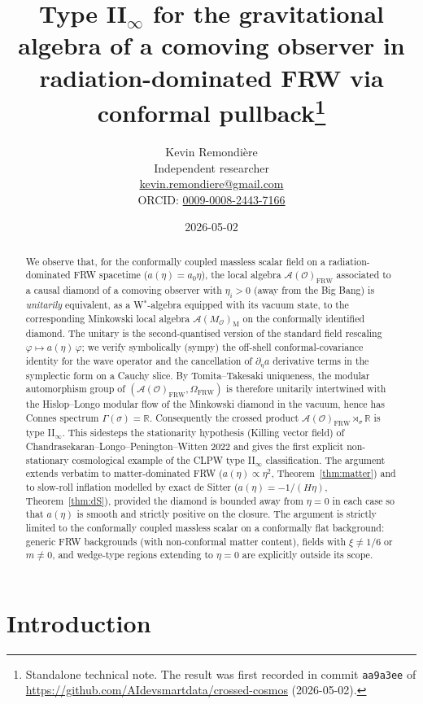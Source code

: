 \documentclass[11pt]{article}
\title{Type II$_\infty$ for the gravitational algebra of a comoving observer in radiation-dominated FRW via conformal pullback\thanks{Standalone technical note. The result was first recorded in commit \texttt{aa9a3ee} of \url{https://github.com/AIdevsmartdata/crossed-cosmos} (2026-05-02).}}
\author{Kevin Remondi\`ere\\
\small Independent researcher\\
\small \href{mailto:kevin.remondiere@gmail.com}{kevin.remondiere@gmail.com}\\
\small ORCID: \href{https://orcid.org/0009-0008-2443-7166}{0009-0008-2443-7166}}
\date{2026-05-02}
\theoremstyle{definition}
\newcommand{\R}{\mathbb{R}}
\renewcommand{\AA}{\mathcal{A}}
\newcommand{\OO}{\mathcal{O}}
\newcommand{\FRW}{\mathrm{FRW}}
\newcommand{\Mink}{\mathrm{M}}
\begin{document}
\maketitle

\begin{abstract}
We observe that, for the conformally coupled massless scalar field on a radiation-dominated FRW spacetime ($a(\eta)=a_0 \eta$), the local algebra $\AA(\OO)_\FRW$ associated to a causal diamond of a comoving observer with $\eta_i>0$ (away from the Big Bang) is \emph{unitarily} equivalent, as a W$^*$-algebra equipped with its vacuum state, to the corresponding Minkowski local algebra $\AA(M_\OO)_\Mink$ on the conformally identified diamond. The unitary is the second-quantised version of the standard field rescaling $\varphi \mapsto a(\eta)\,\varphi$; we verify symbolically (sympy) the off-shell conformal-covariance identity for the wave operator and the cancellation of $\partial_\eta a$ derivative terms in the symplectic form on a Cauchy slice. By Tomita--Takesaki uniqueness, the modular automorphism group of $(\AA(\OO)_\FRW,\Omega_\FRW)$ is therefore unitarily intertwined with the Hislop--Longo modular flow of the Minkowski diamond in the vacuum, hence has Connes spectrum $\Gamma(\sigma)=\R$. Consequently the crossed product $\AA(\OO)_\FRW \rtimes_\sigma \R$ is type II$_\infty$. This sidesteps the stationarity hypothesis (Killing vector field) of Chandrasekaran--Longo--Penington--Witten 2022 and gives the first explicit non-stationary cosmological example of the CLPW type II$_\infty$ classification. The argument extends verbatim to matter-dominated FRW ($a(\eta)\propto \eta^2$, Theorem~\ref{thm:matter}) and to slow-roll inflation modelled by exact de Sitter ($a(\eta) = -1/(H\eta)$, Theorem~\ref{thm:dS}), provided the diamond is bounded away from $\eta = 0$ in each case so that $a(\eta)$ is smooth and strictly positive on the closure. The argument is strictly limited to the conformally coupled massless scalar on a conformally flat background: generic FRW backgrounds (with non-conformal matter content), fields with $\xi \neq 1/6$ or $m \neq 0$, and wedge-type regions extending to $\eta=0$ are explicitly outside its scope.
\end{abstract}

\section{Introduction}\label{sec:intro}
\end{document}
